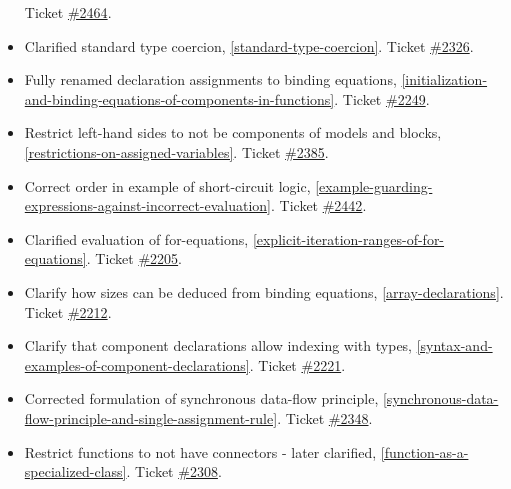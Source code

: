 \begin{itemize}
Ticket \href{https://github.com/modelica/ModelicaSpecification/issues/2464}{\#2464}.
\item Clarified standard type coercion, \cref{standard-type-coercion}.
Ticket \href{https://github.com/modelica/ModelicaSpecification/issues/2326}{\#2326}.
\item Fully renamed declaration assignments to binding equations, \cref{initialization-and-binding-equations-of-components-in-functions}.
Ticket \href{https://github.com/modelica/ModelicaSpecification/issues/2249}{\#2249}.
\item Restrict left-hand sides to not be components of models and blocks, \cref{restrictions-on-assigned-variables}.
Ticket \href{https://github.com/modelica/ModelicaSpecification/issues/2385}{\#2385}.
\item Correct order in example of short-circuit logic, \cref{example-guarding-expressions-against-incorrect-evaluation}.
Ticket \href{https://github.com/modelica/ModelicaSpecification/issues/2442}{\#2442}.
\item Clarified evaluation of for-equations, \cref{explicit-iteration-ranges-of-for-equations}.
Ticket \href{https://github.com/modelica/ModelicaSpecification/issues/2205}{\#2205}.
\item Clarify how sizes can be deduced from binding equations, \cref{array-declarations}.
Ticket \href{https://github.com/modelica/ModelicaSpecification/issues/2212}{\#2212}.
\item Clarify that component declarations allow indexing with types, \cref{syntax-and-examples-of-component-declarations}.
Ticket \href{https://github.com/modelica/ModelicaSpecification/issues/2221}{\#2221}.
\item Corrected formulation of synchronous data-flow principle, \cref{synchronous-data-flow-principle-and-single-assignment-rule}.
Ticket \href{https://github.com/modelica/ModelicaSpecification/issues/2348}{\#2348}.
\item Restrict functions to not have connectors - later clarified, \cref{function-as-a-specialized-class}.
Ticket \href{https://github.com/modelica/ModelicaSpecification/pull/2308}{\#2308}.


\end{itemize}
